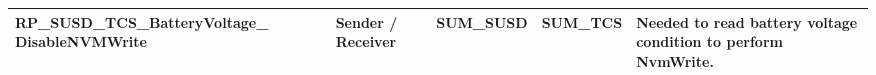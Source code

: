 \begin{longtable}{|l|l|l|l|l|}
\begin{minipage}{0.32\linewidth}\raggedright\vspace{.75ex}RP\_SUSD\_TCS\_BatteryVoltage\_ DisableNVMWrite\vspace{.75ex}\end{minipage} & \begin{minipage}{0.11\linewidth}\raggedright\vspace{.75ex}Sender / Receiver\vspace{.75ex}\end{minipage} & \begin{minipage}{0.11\linewidth}\raggedright\vspace{.75ex}SUM\_SUSD\vspace{.75ex}\end{minipage} & \begin{minipage}{0.11\linewidth}\raggedright\vspace{.75ex}SUM\_TCS\vspace{.75ex}\end{minipage} & \begin{minipage}{0.21\linewidth}\raggedright\vspace{.75ex}Needed to read battery voltage condition to perform NvmWrite.\vspace{.75ex}\end{minipage}\\\hline
\end{longtable}